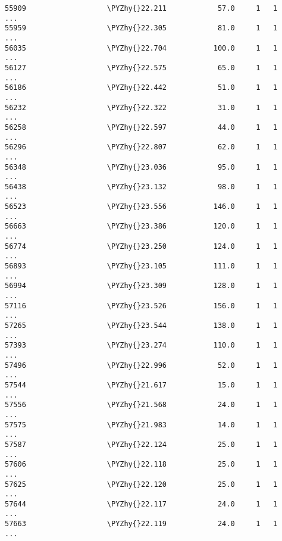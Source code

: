 \documentclass[a4paper,11pt,final]{article}
\def\PYZhy{\char`\-}
\begin{document}
\begin{Verbatim}[commandchars=\\\{\},frame=leftline,fontsize=\small, xleftmargin=0.5em]
55909                   \PYZhy{}22.211            57.0     1   1       ...
55959                   \PYZhy{}22.305            81.0     1   1       ...
56035                   \PYZhy{}22.704           100.0     1   1       ...
56127                   \PYZhy{}22.575            65.0     1   1       ...
56186                   \PYZhy{}22.442            51.0     1   1       ...
56232                   \PYZhy{}22.322            31.0     1   1       ...
56258                   \PYZhy{}22.597            44.0     1   1       ...
56296                   \PYZhy{}22.807            62.0     1   1       ...
56348                   \PYZhy{}23.036            95.0     1   1       ...
56438                   \PYZhy{}23.132            98.0     1   1       ...
56523                   \PYZhy{}23.556           146.0     1   1       ...
56663                   \PYZhy{}23.386           120.0     1   1       ...
56774                   \PYZhy{}23.250           124.0     1   1       ...
56893                   \PYZhy{}23.105           111.0     1   1       ...
56994                   \PYZhy{}23.309           128.0     1   1       ...
57116                   \PYZhy{}23.526           156.0     1   1       ...
57265                   \PYZhy{}23.544           138.0     1   1       ...
57393                   \PYZhy{}23.274           110.0     1   1       ...
57496                   \PYZhy{}22.996            52.0     1   1       ...
57544                   \PYZhy{}21.617            15.0     1   1       ...
57556                   \PYZhy{}21.568            24.0     1   1       ...
57575                   \PYZhy{}21.983            14.0     1   1       ...
57587                   \PYZhy{}22.124            25.0     1   1       ...
57606                   \PYZhy{}22.118            25.0     1   1       ...
57625                   \PYZhy{}22.120            25.0     1   1       ...
57644                   \PYZhy{}22.117            24.0     1   1       ...
57663                   \PYZhy{}22.119            24.0     1   1       ...


\end{Verbatim}
\end{document}
